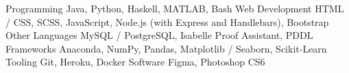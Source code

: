 \begin{cvskills}
  \cvskill
    {Programming} %
    {Java, Python, Haskell, MATLAB, Bash} %
  \cvskill
    {Web Development} %
    {HTML / CSS, SCSS, JavaScript, Node.js (with Express and Handlebars), Bootstrap}
  \cvskill
    {Other Languages} %
    {MySQL / PostgreSQL, Isabelle Proof Assistant, PDDL}
  \cvskill
    {Frameworks} %
    {Anaconda, NumPy, Pandas, Matplotlib / Seaborn, Scikit-Learn}
  \cvskill
    {Tooling} %
    {Git, Heroku, Docker}
  \cvskill
    {Software} %
    {Figma, Photoshop CS6}
\end{cvskills}

